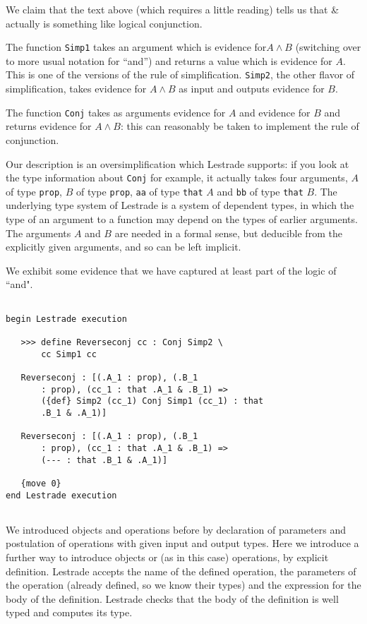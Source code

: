 \documentclass[12pt]{article}
\begin{document}
We claim that the text above (which requires a little reading) tells us that \& actually is something like logical conjunction.

The function {\tt Simp1} takes an argument which is evidence for$A \wedge B$ (switching over to more usual notation for ``and'') and returns a value which is evidence for $A$.  This is one of the versions of the rule of simplification.  {\tt Simp2}, the other flavor of simplification, takes evidence for $A \wedge B$ as input and outputs evidence for $B$.

The function {\tt Conj} takes as arguments evidence for $A$ and evidence for $B$ and returns evidence for $A\wedge B$:  this can reasonably be taken to implement the rule of conjunction.

Our description is an oversimplification which Lestrade supports:  if you look at the type information about {\tt Conj} for example, it actually takes four arguments, $A$ of type {\tt prop}, $B$ of type {\tt prop}, {\tt aa} of type {\tt that} $A$ and
{\tt bb} of type {\tt that} $B$.   The underlying type system of Lestrade is a system of dependent types, in which the type of an argument to a function may depend on the types of earlier arguments.   The arguments $A$ and $B$ are needed in a formal sense, but deducible from the explicitly given arguments, and so can be left implicit.

We exhibit some evidence that we have captured at least part of the logic of ``and".

\begin{verbatim}

begin Lestrade execution

   >>> define Reverseconj cc : Conj Simp2 \
       cc Simp1 cc

   Reverseconj : [(.A_1 : prop), (.B_1 
       : prop), (cc_1 : that .A_1 & .B_1) => 
       ({def} Simp2 (cc_1) Conj Simp1 (cc_1) : that 
       .B_1 & .A_1)]

   Reverseconj : [(.A_1 : prop), (.B_1 
       : prop), (cc_1 : that .A_1 & .B_1) => 
       (--- : that .B_1 & .A_1)]

   {move 0}
end Lestrade execution


\end{verbatim}

We introduced objects and operations before by declaration of parameters and postulation of operations with given input and output types.  Here we introduce a further way to introduce objects or (as in this case) operations, by explicit definition.  Lestrade accepts the name of the defined operation, the parameters of the operation (already defined, so we know their types) and the expression for the body of the definition.  Lestrade checks that the body of the definition is well typed and computes its type.
\end{document}
